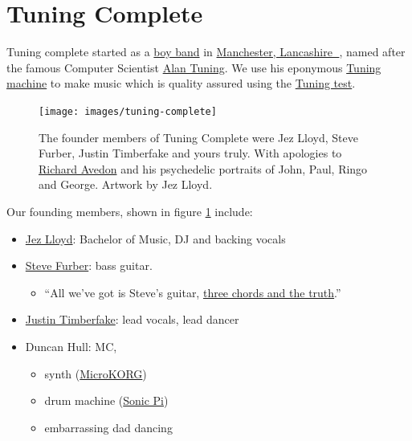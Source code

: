 \documentclass[
  12pt,
]{book}
\providecommand{\tightlist}{%
  \setlength{\itemsep}{0pt}\setlength{\parskip}{0pt}}
\begin{document}
\hypertarget{tuningcomplete}{%
\section{Tuning Complete}\label{tuningcomplete}}

Tuning complete started as a \href{https://en.wikipedia.org/wiki/Boy_band}{boy band} in \href{https://duncan.hull.name/2019/07/05/mancashire/}{Manchester, Lancashire 🌹}, named after the famous Computer Scientist \href{https://en.wikipedia.org/wiki/Alan_Turing}{Alan Tuning}. We use his eponymous \href{https://en.wikipedia.org/wiki/Turing_machine}{Tuning machine} to make music which is quality assured using the \href{https://en.wikipedia.org/wiki/Turing_test}{Tuning test}.

\begin{figure}

{\centering \texttt{[image: images/tuning-complete]} 

}

\caption{The founder members of Tuning Complete were Jez Lloyd, Steve Furber, Justin Timberfake and yours truly. With apologies to \href{https://en.wikipedia.org/wiki/Richard_Avedon}{Richard Avedon} and his psychedelic portraits of John, Paul, Ringo and George. Artwork by Jez Lloyd.}\label{fig:beatles-fig}
\end{figure}



Our founding members, shown in figure \ref{fig:beatles-fig} include:

\begin{itemize}
\tightlist
\item
  \href{https://www.linkedin.com/in/jez-lloyd-84077069}{Jez Lloyd}: Bachelor of Music, DJ and backing vocals
\item
  \href{https://en.wikipedia.org/wiki/Steve_Furber}{Steve Furber}: bass guitar.

  \begin{itemize}
  \tightlist
  \item
    ``All we've got is Steve's guitar, \href{https://en.wikipedia.org/wiki/Three_Chords_and_the_Truth}{three chords and the truth}.'' \citep{harlan, allalongthewatchtower}
  \end{itemize}
\item
  \href{https://en.wikipedia.org/wiki/Justin_Timberlake}{Justin Timberfake}: lead vocals, lead dancer \citep{cantstopthefeeling}
\item
  Duncan Hull: MC,

  \begin{itemize}
  \tightlist
  \item
    synth (\href{https://en.wikipedia.org/wiki/MicroKORG}{MicroKORG})
  \item
    drum machine (\href{https://sonic-pi.net/}{Sonic Pi})
  \item
    embarrassing dad dancing \citep{daddancing}
  \end{itemize}
\end{itemize}
\end{document}
